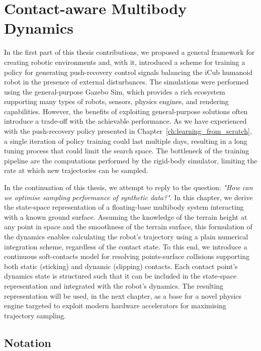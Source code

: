 \chapter{Contact-aware Multibody Dynamics}
\label{ch:contact_aware_dynamics}

In the first part of this thesis contributions, we proposed a general framework for creating robotic environments and, with it, introduced a scheme for training a policy for generating push-recovery control signals balancing the iCub humanoid robot in the presence of external disturbances.
The simulations were performed using the general-purpose Gazebo Sim, which provides a rich ecosystem supporting many types of robots, sensors, physics engines, and rendering capabilities.
However, the benefits of exploiting general-purpose solutions often introduce a trade-off with the achievable performance.
As we have experienced with the push-recovery policy presented in Chapter~\ref{ch:learning_from_scratch}, a single iteration of policy training could last multiple days, resulting in a long tuning process that could limit the search space.
The bottleneck of the training pipeline are the computations performed by the rigid-body simulator, limiting the rate at which new trajectories can be sampled.

In the continuation of this thesis, we attempt to reply to the question: \textit{"How can we optimise sampling performance of synthetic data?"}.
In this chapter, we derive the state-space representation of a floating-base multibody system interacting with a known ground surface.
Assuming the knowledge of the terrain height at any point in space and the smoothness of the terrain surface, this formulation of the dynamics enables calculating the robot's trajectory using a plain numerical integration scheme, regardless of the contact state.
To this end, we introduce a continuous soft-contacts model for resolving points-surface collisions supporting both static (sticking) and dynamic (slipping) contacts.
Each contact point's dynamics state is structured such that it can be included in the state-space representation and integrated with the robot's dynamics.
The resulting representation will be used, in the next chapter, as a base for a novel physics engine targeted to exploit modern hardware accelerators for maximising trajectory sampling.

\section{Notation}

